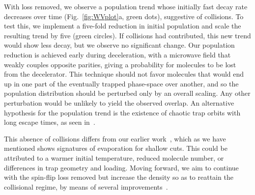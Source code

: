 \documentclass[%
 reprint,
 amsmath,amssymb,
 aps,
prl,
]{revtex4-1}
\newcommand{\cmnt}[1]{\ignorespaces}
\begin{document}
With loss removed, we observe a population trend whose initially fast decay rate decreases over time (Fig.~\ref{fig:WVplot}a, green dots), suggestive of collisions. To test this, we implement a five-fold reduction in initial population and scale the resulting trend by five (green circles). If collisions had contributed, this new trend would show less decay, but we observe no significant change. Our population reduction is achieved early during deceleration, with a microwave field that weakly couples opposite parities, giving a probability for molecules to be lost from the decelerator. This technique should not favor molecules that would end up in one part of the eventually trapped phase-space over another, and so the population distribution should be perturbed only by an overall scaling. Any other perturbation would be unlikely to yield the observed overlap. An alternative hypothesis for the population trend is the existence of chaotic trap orbits with long escape times, as seen in~\cite{Gonzalez-Ferez2014}.

This absence of collisions differs from our earlier work~\cite{Stuhl2012evap}, which as we have mentioned shows signatures of evaporation for shallow cuts. This could be attributed to a warmer initial temperature, reduced molecule number, or differences in trap geometry and loading. \cmnt{It is also possible that the spin-flip loss is playing a role even for the light evaporation cuts, although it is unclear how this could masquerade as a normalized low field density enhancement.} Moving forward, we aim to continue with the spin-flip loss removed but increase the density so as to reattain the collisional regime, by means of several improvements~\cite{Even2015,Segev2017}.

\end{document}
